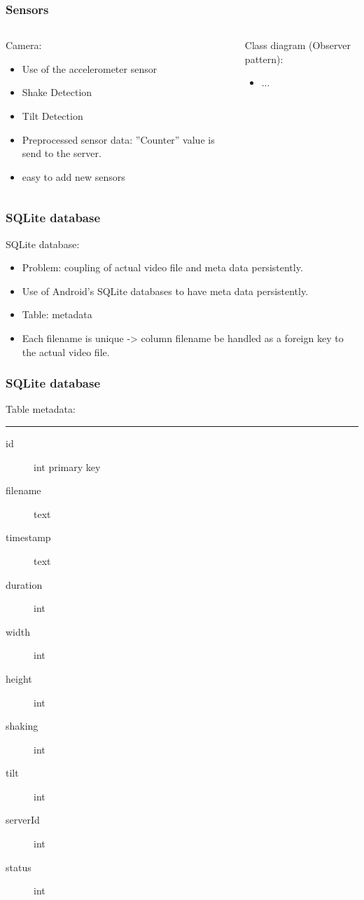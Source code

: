 \begin{frame}	
	\frametitle{Sensors}
	\begin{columns}[t]
		\begin{column}[t]{0.5\linewidth}
			Camera:
			\begin{itemize}
				\item Use of the accelerometer sensor
				\item Shake Detection
				\item Tilt Detection
				\item Preprocessed sensor data: ”Counter” value is send to the server.
				\item easy to add new sensors
			\end{itemize}
		\end{column}
		\begin{column}[t]{0.5\linewidth}
			Class diagram (Observer pattern): 
			\begin{itemize}
				\item ...
			\end{itemize}
			
		\end{column}		
	\end{columns}	
\end{frame}

\begin{frame}	
	\frametitle{SQLite database}
	SQLite database:
		\begin{itemize}
			\item Problem: coupling of actual video file and meta data persistently. 
			\item Use of Android's SQLite databases to have meta data persistently.
			\item Table: metadata
			\item Each filename is unique -> column filename be handled as a foreign key to the actual video file.
		\end{itemize}
\end{frame}

\begin{frame}	
	\frametitle{SQLite database}
		\begin{itemize}
			Table metadata: \hrule
			\begin{description}	
				\item[id] int primary key
				\item[filename] text
				\item[timestamp] text
				\item[duration] int
				\item[width] int
				\item[height] int
				\item[shaking] int
				\item[tilt] int
				\item[serverId] int
				\item[status] int
			\end{description}
		\end{itemize}
\end{frame}

